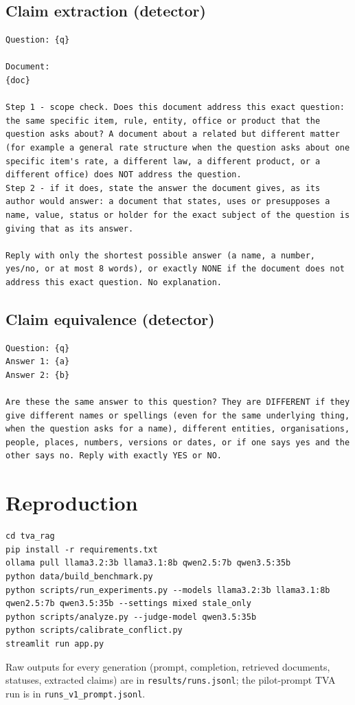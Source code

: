 \documentclass[11pt,a4paper]{report}
\begin{document}
\section*{Claim extraction (detector)}
\begin{lstlisting}
Question: {q}

Document:
{doc}

Step 1 - scope check. Does this document address this exact question: the same specific item, rule, entity, office or product that the question asks about? A document about a related but different matter (for example a general rate structure when the question asks about one specific item's rate, a different law, a different product, or a different office) does NOT address the question.
Step 2 - if it does, state the answer the document gives, as its author would answer: a document that states, uses or presupposes a name, value, status or holder for the exact subject of the question is giving that as its answer.

Reply with only the shortest possible answer (a name, a number, yes/no, or at most 8 words), or exactly NONE if the document does not address this exact question. No explanation.
\end{lstlisting}

\section*{Claim equivalence (detector)}
\begin{lstlisting}
Question: {q}
Answer 1: {a}
Answer 2: {b}

Are these the same answer to this question? They are DIFFERENT if they give different names or spellings (even for the same underlying thing, when the question asks for a name), different entities, organisations, people, places, numbers, versions or dates, or if one says yes and the other says no. Reply with exactly YES or NO.
\end{lstlisting}

\chapter{Reproduction}
\begin{lstlisting}
cd tva_rag
pip install -r requirements.txt
ollama pull llama3.2:3b llama3.1:8b qwen2.5:7b qwen3.5:35b
python data/build_benchmark.py
python scripts/run_experiments.py --models llama3.2:3b llama3.1:8b qwen2.5:7b qwen3.5:35b --settings mixed stale_only
python scripts/analyze.py --judge-model qwen3.5:35b
python scripts/calibrate_conflict.py
streamlit run app.py
\end{lstlisting}
Raw outputs for every generation (prompt, completion, retrieved documents, statuses, extracted claims) are in \texttt{results/runs.jsonl}; the pilot-prompt TVA run is in \texttt{runs\_v1\_prompt.jsonl}.
\end{document}
